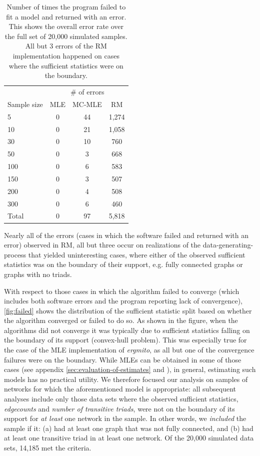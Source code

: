 \documentclass[review, nonatbib,doubleblind]{elsarticle/elsarticle}
\begin{document}
\begin{table}[htb]
\centering
\begin{tabular}{lccc}
\toprule & \multicolumn{3}{c}{\# of errors} \\ \cmidrule(r){2-4}
Sample size & MLE & MC-MLE & RM \\ 
  \midrule
5 &   0 &  44 & 1,274 \\ 
  10 &   0 &  21 & 1,058 \\ 
  30 &   0 &  10 & 760 \\ 
  50 &   0 &   3 & 668 \\ 
  100 &   0 &   6 & 583 \\ 
  150 &   0 &   3 & 507 \\ 
  200 &   0 &   4 & 508 \\ 
  300 &   0 &   6 & 460 \\ 
  \midrule Total &   0 &  97 & 5,818 \\ 
   \bottomrule
\end{tabular}
\caption{\label{tab:error-sampsize}Number of times the program failed to fit a model and returned with an error. This shows the overall error rate over the full set of 20,000 simulated samples. All but 3 errors of the RM implementation happened on cases where the sufficient statistics were on the boundary.} 
\end{table}


 Nearly all of the errors (cases in which the software failed and returned with an error) observed in RM, all but three occur on realizations of the data-generating-process that yielded uninteresting cases, where either of the observed sufficient statistics was on the boundary of their support, e.g. fully connected graphs or graphs with no triads.

With respect to those cases in which the algorithm failed to converge (which includes both software errors and the program reporting lack of convergence), \autoref{fig:failed} shows the distribution of the sufficient statistic split based on whether the algorithm converged or failed to do so. As shown in the figure, when the algorithms did not converge it was typically due to sufficient statistics falling on the boundary of its support (convex-hull problem). This was especially true for the case of the MLE implementation of \textit{ergmito}, as all but one of the convergence failures were on the boundary. While MLEs can be obtained in some of those cases (see appendix \ref{sec:evaluation-of-estimates} and \cite{Handcock2003}), in general, estimating such models has no practical utility. We therefore focused our analysis on samples of networks for which the aforementioned model is appropriate: all subsequent analyses include only those data sets where the observed sufficient statistics, \textit{edgecounts} and \textit{number of transitive triads}, were not on the boundary of its support for \textit{at least} one network in the sample. In other words, we \textit{included} the sample if it: (a) had at least one graph that was not fully connected, and (b) had at least one transitive triad in at least one network. Of the 20,000 simulated data sets, 14,185 met the criteria. 
\end{document}
